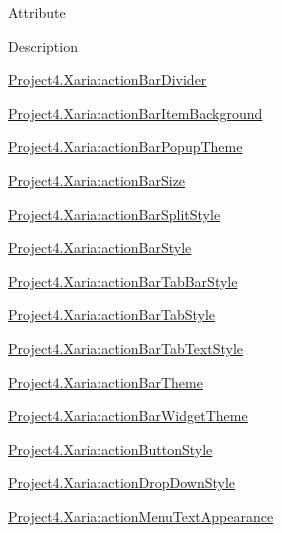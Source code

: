 Attribute

Description 

{\ttfamily \hyperlink{classproject4_1_1xaria_1_1R_1_1styleable_ad095f54263895a9187adcc505fb74a8f}{Project4.\+Xaria\+:action\+Bar\+Divider}}

{\ttfamily \hyperlink{classproject4_1_1xaria_1_1R_1_1styleable_a41713bbf73db9bc84e075b5f7f3d9eac}{Project4.\+Xaria\+:action\+Bar\+Item\+Background}}

{\ttfamily \hyperlink{classproject4_1_1xaria_1_1R_1_1styleable_a4ab9cdea85449aae1d84d21ff4fb2cfa}{Project4.\+Xaria\+:action\+Bar\+Popup\+Theme}}

{\ttfamily \hyperlink{classproject4_1_1xaria_1_1R_1_1styleable_ab4089eb2d0e03e7fe09ecada776ec627}{Project4.\+Xaria\+:action\+Bar\+Size}}

{\ttfamily \hyperlink{classproject4_1_1xaria_1_1R_1_1styleable_ac50c18be5c3e3ba9e240f8f463553bb8}{Project4.\+Xaria\+:action\+Bar\+Split\+Style}}

{\ttfamily \hyperlink{classproject4_1_1xaria_1_1R_1_1styleable_abe5ffee6e83546a5c7599f052a12bdba}{Project4.\+Xaria\+:action\+Bar\+Style}}

{\ttfamily \hyperlink{classproject4_1_1xaria_1_1R_1_1styleable_a8061a97d3435cd3b90071e77b6a384d0}{Project4.\+Xaria\+:action\+Bar\+Tab\+Bar\+Style}}

{\ttfamily \hyperlink{classproject4_1_1xaria_1_1R_1_1styleable_ac191cc6e34d8b07e8c5375d0e9060ad5}{Project4.\+Xaria\+:action\+Bar\+Tab\+Style}}

{\ttfamily \hyperlink{classproject4_1_1xaria_1_1R_1_1styleable_ac76a4f213c72e9795418b8e7289f0feb}{Project4.\+Xaria\+:action\+Bar\+Tab\+Text\+Style}}

{\ttfamily \hyperlink{classproject4_1_1xaria_1_1R_1_1styleable_a872840b3faa033949bb39c7e8ccf3802}{Project4.\+Xaria\+:action\+Bar\+Theme}}

{\ttfamily \hyperlink{classproject4_1_1xaria_1_1R_1_1styleable_acd160671a7a2ffa11d0fcabb3488ff5f}{Project4.\+Xaria\+:action\+Bar\+Widget\+Theme}}

{\ttfamily \hyperlink{classproject4_1_1xaria_1_1R_1_1styleable_ac0a46ce92a97f618843444fe78e175e5}{Project4.\+Xaria\+:action\+Button\+Style}}

{\ttfamily \hyperlink{classproject4_1_1xaria_1_1R_1_1styleable_a3ed86c6082101f35233a25e96d5bd2f3}{Project4.\+Xaria\+:action\+Drop\+Down\+Style}}

{\ttfamily \hyperlink{classproject4_1_1xaria_1_1R_1_1styleable_aaf321468ea719fc98d678e0a033cf5b4}{Project4.\+Xaria\+:action\+Menu\+Text\+Appearance}}

